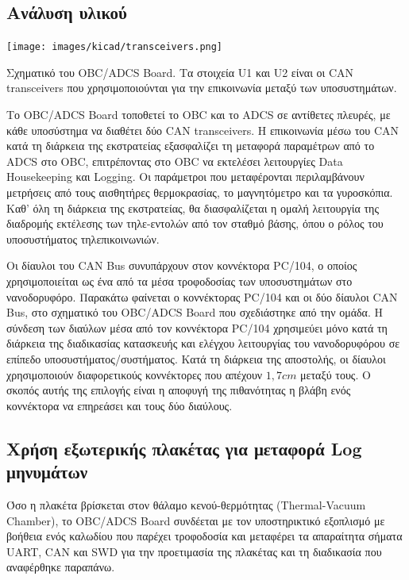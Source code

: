 \documentclass[a4paper,nobib,justified]{tufte-book}
\begin{document}
\subsection{Ανάλυση υλικού}
\begin{marginfigure}
	\texttt{[image: images/kicad/transceivers.png]}
	\caption[Σχηματικό του OBC/ADCS Board]{Σχηματικό του OBC/ADCS Board. Τα στοιχεία U1 και U2 είναι οι CAN transceivers που χρησιμοποιούνται για την επικοινωνία μεταξύ των υποσυστημάτων.}
	\label{fig:schematic-transceivers}
\end{marginfigure}

Το OBC/ADCS Board τοποθετεί το OBC και το ADCS σε αντίθετες πλευρές, με κάθε υποσύστημα να διαθέτει δύο CAN transceivers. Η επικοινωνία μέσω του CAN κατά τη διάρκεια της εκστρατείας εξασφαλίζει τη μεταφορά παραμέτρων από το ADCS στο OBC, επιτρέποντας στο OBC να εκτελέσει λειτουργίες Data Housekeeping και Logging. Οι παράμετροι που μεταφέρονται περιλαμβάνουν μετρήσεις από τους αισθητήρες θερμοκρασίας, το μαγνητόμετρο και τα γυροσκόπια. Καθ' όλη τη διάρκεια της εκστρατείας, θα διασφαλίζεται η ομαλή λειτουργία της διαδρομής εκτέλεσης των τηλε-εντολών από τον σταθμό βάσης, όπου ο ρόλος του υποσυστήματος τηλεπικοινωνιών.

Οι δίαυλοι του CAN Bus συνυπάρχουν στον κοννέκτορα PC/104, ο οποίος χρησιμοποιείται ως ένα από τα μέσα τροφοδοσίας των υποσυστημάτων στο νανοδορυφόρο. Παρακάτω φαίνεται ο κοννέκτορας PC/104 και οι δύο δίαυλοι CAN Bus, στο σχηματικό του OBC/ADCS Board που σχεδιάστηκε από την ομάδα. Η σύνδεση των διαύλων μέσα από τον κοννέκτορα PC/104 χρησιμεύει μόνο κατά τη διάρκεια της διαδικασίας κατασκευής και ελέγχου λειτουργίας του νανοδορυφόρου σε επίπεδο υποσυστήματος/συστήματος. Κατά τη διάρκεια της αποστολής, οι δίαυλοι χρησιμοποιούν διαφορετικούς κοννέκτορες που απέχουν $1,7cm$ μεταξύ τους. Ο σκοπός αυτής της επιλογής είναι η αποφυγή της πιθανότητας η βλάβη ενός κοννέκτορα να επηρεάσει και τους δύο διαύλους. 

\subsection{Χρήση εξωτερικής πλακέτας για μεταφορά Log μηνυμάτων}
Όσο η πλακέτα βρίσκεται στον θάλαμο κενού-θερμότητας (Thermal-Vacuum Chamber), το OBC/ADCS Board συνδέεται με τον υποστηρικτικό εξοπλισμό με βοήθεια ενός καλωδίου που παρέχει τροφοδοσία και μεταφέρει τα απαραίτητα σήματα UART, CAN και SWD για την προετιμασία της πλακέτας και τη διαδικασία που αναφέρθηκε παραπάνω.
\end{document}
